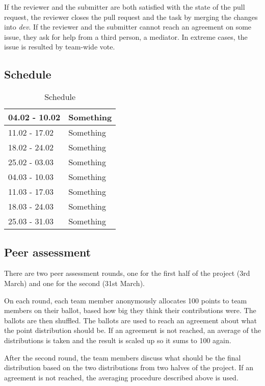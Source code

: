 \documentclass[a4paper,12pt]{article}
\begin{document}
If the reviewer and the submitter are both satisfied with the state of the pull request, the reviewer closes the pull request and the task by merging the changes into \emph{dev}. If the reviewer and the submitter cannot reach an agreement on some issue, they ask for help from a third person, a mediator. In extreme cases, the issue is resulted by team-wide vote.

\subsection{Schedule}
\begin{table}[!htbp]
    \centering
    \caption{Schedule}
    \label{schedule}
    \begin{tabular}{|l|l|}
        \hline
        04.02 - 10.02 & Something \\ \hline
        11.02 - 17.02 & Something \\ \hline
        18.02 - 24.02 & Something \\ \hline
        25.02 - 03.03 & Something \\ \hline
        04.03 - 10.03 & Something \\ \hline
        11.03 - 17.03 & Something \\ \hline
        18.03 - 24.03 & Something \\ \hline
        25.03 - 31.03 & Something \\ \hline
    \end{tabular}
\end{table}

\subsection{Peer assessment}
There are two peer assessment rounds, one for the first half of the project (3rd March) and one for the second (31st March).

On each round, each team member anonymously allocates 100 points to team members on their ballot, based how big they think their contributions were. The ballots are then shuffled. The ballots are used to reach an agreement about what the point distribution should be. If an agreement is not reached, an average of the distributions is taken and the result is scaled up so it sums to 100 again.

After the second round, the team members discuss what should be the final distribution based on the two distributions from two halves of the project. If an agreement is not reached, the averaging procedure described above is used.
\end{document}
